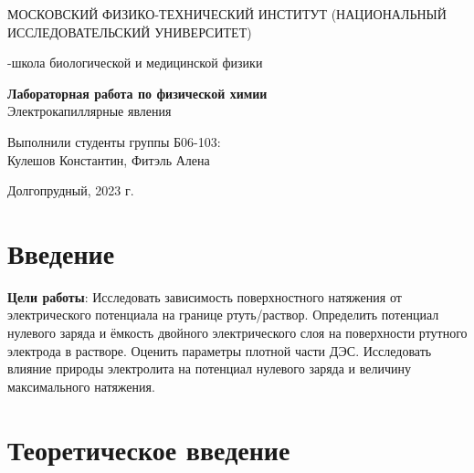 \documentclass[a4paper,12pt]{article}
\begin{document}
\def\figurename{Рисунок}
\begin{titlepage}

\begin{center}
    {\large МОСКОВСКИЙ ФИЗИКО-ТЕХНИЧЕСКИЙ ИНСТИТУТ (НАЦИОНАЛЬНЫЙ ИССЛЕДОВАТЕЛЬСКИЙ УНИВЕРСИТЕТ)}
\end{center}
\begin{center}
    {-школа биологической и медицинской физики}
\end{center}

\vspace{1cm}
{\huge
\begin{center}
    {\bf Лабораторная работа по физической химии}\\
    \vspace{0.5cm}
    Электрокапиллярные явления
\end{center}
}

\vspace{4cm}
\begin{flushright}
{\LARGE Выполнили студенты группы Б06-103:\\ Кулешов Константин, Фитэль Алена \\}

\end{flushright}
\vspace{9cm}
\begin{center}
    Долгопрудный, 2023 г.
\end{center}
\end{titlepage}

\newpage
\newpage
\section{Введение}
\textbf{Цели работы}: Исследовать зависимость поверхностного натяжения от электрического потенциала на границе ртуть/раствор. Определить потенциал нулевого
заряда и ёмкость двойного электрического слоя на поверхности ртутного электрода в растворе. Оценить параметры плотной части ДЭС. Исследовать влияние природы электролита на потенциал нулевого заряда и
величину максимального натяжения.
\section{Теоретическое введение}
\end{document}
